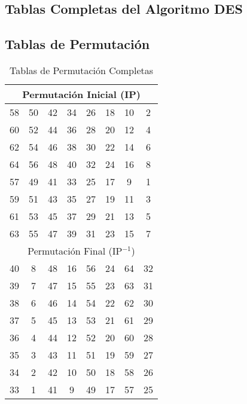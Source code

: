 \documentclass[12pt,a4paper]{article}
\begin{document}
\begin{appendix}
	\section{Tablas Completas del Algoritmo DES}

	\subsection{Tablas de Permutación}
	\begin{table}[ht]
		\centering
		\caption{Tablas de Permutación Completas}
		\begin{tabular}{|c|c|c|c|c|c|c|c|}
			\hline
			\multicolumn{8}{|c|}{Permutación Inicial (IP)}      \\
			\hline
			58 & 50 & 42 & 34 & 26 & 18 & 10 & 2                \\
			60 & 52 & 44 & 36 & 28 & 20 & 12 & 4                \\
			62 & 54 & 46 & 38 & 30 & 22 & 14 & 6                \\
			64 & 56 & 48 & 40 & 32 & 24 & 16 & 8                \\
			57 & 49 & 41 & 33 & 25 & 17 & 9  & 1                \\
			59 & 51 & 43 & 35 & 27 & 19 & 11 & 3                \\
			61 & 53 & 45 & 37 & 29 & 21 & 13 & 5                \\
			63 & 55 & 47 & 39 & 31 & 23 & 15 & 7                \\
			\hline
			\multicolumn{8}{|c|}{Permutación Final (IP$^{-1}$)} \\
			\hline
			40 & 8  & 48 & 16 & 56 & 24 & 64 & 32               \\
			39 & 7  & 47 & 15 & 55 & 23 & 63 & 31               \\
			38 & 6  & 46 & 14 & 54 & 22 & 62 & 30               \\
			37 & 5  & 45 & 13 & 53 & 21 & 61 & 29               \\
			36 & 4  & 44 & 12 & 52 & 20 & 60 & 28               \\
			35 & 3  & 43 & 11 & 51 & 19 & 59 & 27               \\
			34 & 2  & 42 & 10 & 50 & 18 & 58 & 26               \\
			33 & 1  & 41 & 9  & 49 & 17 & 57 & 25               \\
			\hline
		\end{tabular}
	\end{table}


\end{appendix}
\end{document}
